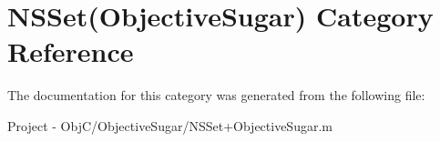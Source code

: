 \hypertarget{category_n_s_set_07_objective_sugar_08}{}\section{N\+S\+Set(Objective\+Sugar) Category Reference}
\label{category_n_s_set_07_objective_sugar_08}


The documentation for this category was generated from the following file\+:\begin{DoxyCompactItemize}
\item 
Project -\/ Obj\+C/\+Objective\+Sugar/N\+S\+Set+\+Objective\+Sugar.\+m\end{DoxyCompactItemize}
